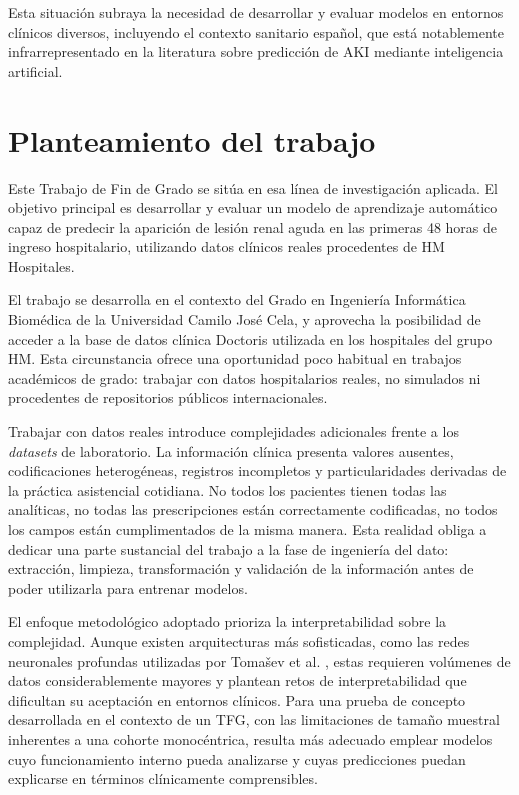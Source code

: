\documentclass[12pt, a4paper, oneside]{report}
\begin{document}
Esta situación subraya la necesidad de desarrollar y evaluar modelos en entornos clínicos diversos, incluyendo el contexto sanitario español, que está notablemente infrarrepresentado en la literatura sobre predicción de AKI mediante inteligencia artificial.

\section{Planteamiento del trabajo}

Este Trabajo de Fin de Grado se sitúa en esa línea de investigación aplicada. El objetivo principal es desarrollar y evaluar un modelo de aprendizaje automático capaz de predecir la aparición de lesión renal aguda en las primeras 48 horas de ingreso hospitalario, utilizando datos clínicos reales procedentes de HM Hospitales.

El trabajo se desarrolla en el contexto del Grado en Ingeniería Informática Biomédica de la Universidad Camilo José Cela, y aprovecha la posibilidad de acceder a la base de datos clínica Doctoris utilizada en los hospitales del grupo HM. Esta circunstancia ofrece una oportunidad poco habitual en trabajos académicos de grado: trabajar con datos hospitalarios reales, no simulados ni procedentes de repositorios públicos internacionales.

Trabajar con datos reales introduce complejidades adicionales frente a los \textit{datasets} de laboratorio. La información clínica presenta valores ausentes, codificaciones heterogéneas, registros incompletos y particularidades derivadas de la práctica asistencial cotidiana. No todos los pacientes tienen todas las analíticas, no todas las prescripciones están correctamente codificadas, no todos los campos están cumplimentados de la misma manera. Esta realidad obliga a dedicar una parte sustancial del trabajo a la fase de ingeniería del dato: extracción, limpieza, transformación y validación de la información antes de poder utilizarla para entrenar modelos.

El enfoque metodológico adoptado prioriza la interpretabilidad sobre la complejidad. Aunque existen arquitecturas más sofisticadas, como las redes neuronales profundas utilizadas por Tomašev et al. \parencite{tomasev2019nature}, estas requieren volúmenes de datos considerablemente mayores y plantean retos de interpretabilidad que dificultan su aceptación en entornos clínicos. Para una prueba de concepto desarrollada en el contexto de un TFG, con las limitaciones de tamaño muestral inherentes a una cohorte monocéntrica, resulta más adecuado emplear modelos cuyo funcionamiento interno pueda analizarse y cuyas predicciones puedan explicarse en términos clínicamente comprensibles.
\end{document}
